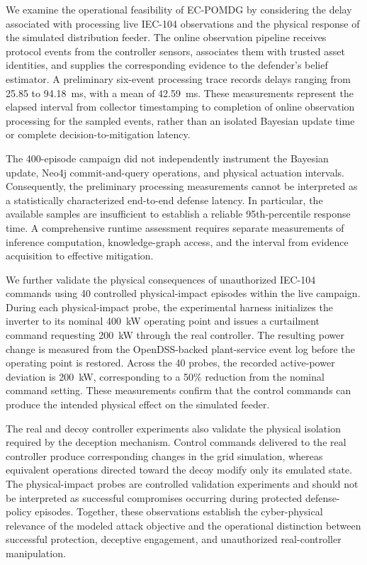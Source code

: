 \documentclass[10pt,conference]{IEEEtran}
\begin{document}
We examine the operational feasibility of EC-POMDG by considering the delay associated with processing live IEC-104 observations and the physical response of the simulated distribution feeder. The online observation pipeline receives protocol events from the controller sensors, associates them with trusted asset identities, and supplies the corresponding evidence to the defender's belief estimator. A preliminary six-event processing trace records delays ranging from 25.85 to 94.18~ms, with a mean of 42.59~ms. These measurements represent the elapsed interval from collector timestamping to completion of online observation processing for the sampled events, rather than an isolated Bayesian update time or complete decision-to-mitigation latency.

The 400-episode campaign did not independently instrument the Bayesian update, Neo4j commit-and-query operations, and physical actuation intervals. Consequently, the preliminary processing measurements cannot be interpreted as a statistically characterized end-to-end defense latency. In particular, the available samples are insufficient to establish a reliable 95th-percentile response time. A comprehensive runtime assessment requires separate measurements of inference computation, knowledge-graph access, and the interval from evidence acquisition to effective mitigation.

We further validate the physical consequences of unauthorized IEC-104 commands using 40 controlled physical-impact episodes within the live campaign. During each physical-impact probe, the experimental harness initializes the inverter to its nominal 400~kW operating point and issues a curtailment command requesting 200~kW through the real controller. The resulting power change is measured from the OpenDSS-backed plant-service event log before the operating point is restored. Across the 40 probes, the recorded active-power deviation is 200~kW, corresponding to a 50\% reduction from the nominal command setting. These measurements confirm that the control commands can produce the intended physical effect on the simulated feeder.

The real and decoy controller experiments also validate the physical isolation required by the deception mechanism. Control commands delivered to the real controller produce corresponding changes in the grid simulation, whereas equivalent operations directed toward the decoy modify only its emulated state. The physical-impact probes are controlled validation experiments and should not be interpreted as successful compromises occurring during protected defense-policy episodes. Together, these observations establish the cyber-physical relevance of the modeled attack objective and the operational distinction between successful protection, deceptive engagement, and unauthorized real-controller manipulation.
\end{document}
